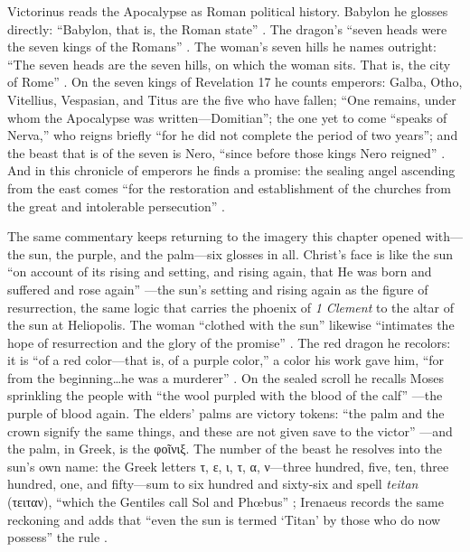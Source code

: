 Victorinus reads the Apocalypse as Roman political history.
Babylon he glosses directly: ``Babylon, that is, the Roman state'' \cite[Rev 7]{victorinus:apocalypse}.
The dragon's ``seven heads were the seven kings of the Romans'' \cite[Rev 12]{victorinus:apocalypse}.
The woman's seven hills he names outright: ``The seven heads are the seven hills, on which the woman sits. That is, the city of Rome'' \cite[Rev 17]{victorinus:apocalypse}.
On the seven kings of Revelation 17 he counts emperors: Galba, Otho, Vitellius, Vespasian, and Titus are the five who have fallen; ``One remains, under whom the Apocalypse was written---Domitian''; the one yet to come ``speaks of Nerva,'' who reigns briefly ``for he did not complete the period of two years''; and the beast that is of the seven is Nero, ``since before those kings Nero reigned'' \cite[Rev 17]{victorinus:apocalypse}.
And in this chronicle of emperors he finds a promise: the sealing angel ascending from the east comes ``for the restoration and establishment of the churches from the great and intolerable persecution'' \cite[Rev 7]{victorinus:apocalypse}.

The same commentary keeps returning to the imagery this chapter opened with---the sun, the purple, and the palm---six glosses in all.
Christ's face is like the sun ``on account of its rising and setting, and rising again, that He was born and suffered and rose again'' \cite[Rev 1]{victorinus:apocalypse}---the sun's setting and rising again as the figure of resurrection, the same logic that carries the phoenix of \emph{1 Clement} to the altar of the sun at Heliopolis.
The woman ``clothed with the sun'' likewise ``intimates the hope of resurrection and the glory of the promise'' \cite[Rev 12]{victorinus:apocalypse}.
The red dragon he recolors: it is ``of a red color---that is, of a purple color,'' a color his work gave him, ``for from the beginning\ldots he was a murderer'' \cite[Rev 12]{victorinus:apocalypse}.
On the sealed scroll he recalls Moses sprinkling the people with ``the wool purpled with the blood of the calf'' \cite[Rev 5]{victorinus:apocalypse}---the purple of blood again.
The elders' palms are victory tokens: ``the palm and the crown signify the same things, and these are not given save to the victor'' \cite[Rev 4]{victorinus:apocalypse}---and the palm, in Greek, is the φοῖνιξ.
The number of the beast he resolves into the sun's own name: the Greek letters τ, ε, ι, τ, α, ν---three hundred, five, ten, three hundred, one, and fifty---sum to six hundred and sixty-six and spell \emph{teitan} (τειταν), ``which the Gentiles call Sol and Phœbus'' \cite[Rev 13]{victorinus:apocalypse}; Irenaeus records the same reckoning and adds that ``even the sun is termed `Titan' by those who do now possess'' the rule \cite[5.30.3]{irenaeus:advhaer}.

